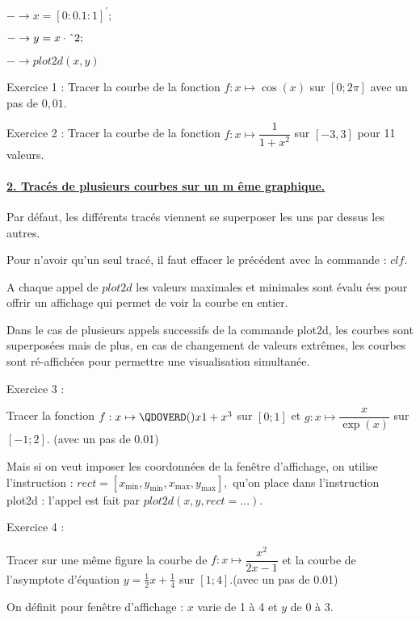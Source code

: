 \documentclass{article}
\begin{document}
$-\rightarrow x=[0:0.1:1]^{\prime };$

$-\rightarrow y=x\cdot \symbol{94}2;$

$-\rightarrow plot2d(x,y)$

Exercice 1 : Tracer la courbe de la fonction $f:x\mapsto \cos (x)$ sur $%
\left[ 0;2\pi \right] $ avec un pas de $0,01.$

Exercice 2 : Tracer la courbe de la fonction $f:x\mapsto \dfrac{1}{1+x^{2}}$
sur $\left[ -3,3\right] $ pour 11 valeurs.

\paragraph{\protect\underline{2. Trac\'{e}s de plusieurs courbes sur un m%
\^{e}me graphique.}}

Par d\'{e}faut, les diff\'{e}rents trac\'{e}s viennent se superposer les uns
par dessus les autres.

Pour n'avoir qu'un seul trac\'{e}, il faut effacer le pr\'{e}c\'{e}dent avec
la commande : $clf.$

A chaque appel de $plot2d$ les valeurs maximales et minimales sont \'{e}valu%
\'{e}es pour offrir un affichage qui permet de voir la courbe en entier.

Dans le cas de plusieurs appels successifs de la commande plot2d, les
courbes sont superpos\'{e}es mais de plus, en cas de changement de valeurs
extr\^{e}mes, les courbes sont r\'{e}-affich\'{e}es pour permettre une
visualisation simultan\'{e}e.

Exercice 3 :

Tracer la fonction $f:x\mapsto \QDOVERD( ) {x}{1+x^{3}}$ sur $\left[ 0;1%
\right] $ et $g:x\mapsto \dfrac{x}{\exp (x)}$ sur $\left[ -1;2\right] .$
(avec un pas de 0.01)

Mais si on veut imposer les coordonn\'{e}es de la fen\^{e}tre d'affichage,
on utilise l'instruction : $rect=[x_{\min },y_{\min },x_{\max },y_{\max }],$
qu'on place dans l'instruction plot2d : l'appel est fait par $%
plot2d(x,y,rect=...).$

Exercice 4 :

Tracer sur une m\^{e}me figure la courbe de $f:x\mapsto \dfrac{x^{2}}{2x-1}$
et la courbe de l'asymptote d'\'{e}quation $y=\frac{1}{2}x+\frac{1}{4}$ sur $%
\left[ 1;4\right] .$(avec un pas de 0.01)

On d\'{e}finit pour fen\^{e}tre d'affichage : $x$ varie de 1 \`{a} 4 et $y$
de 0 \`{a} 3.

\bigskip
\end{document}
